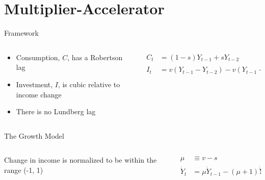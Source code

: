 \documentclass{beamer}
\begin{document}
\section*{Multiplier-Accelerator}
\begin{frame}{Framework}
	\begin{columns}
	\begin{column}{0.5\textwidth}
		\begin{itemize}
			\item Consumption, $C$, has a Robertson lag
			\item Investment, $I$, is cubic relative to income change
			\item There is no Lundberg lag
		\end{itemize}
	\end{column}
	\begin{column}{0.5\textwidth}
		\begin{align*}
			C_t &= (1-s)Y_{t-1} + sY_{t-2}\\
			I_t &= v(Y_{t-1}-Y_{t-2})-v(Y_{t-1}-Y_{t-2})^3
		\end{align*}
	\end{column}
	\end{columns}
\end{frame}
\begin{frame}{The Growth Model}
	\begin{columns}
	\begin{column}{0.5\textwidth}
		Change in income is normalized\autocite{Puu2003} to be within the range (-1, 1)
	\end{column}
	\begin{column}{0.5\textwidth}
		\begin{align*}
			\mu &\equiv v-s\\
			\dot Y_t &= \mu\dot Y_{t-1}-(\mu+1)\dot Y_{t-1}^3
		\end{align*}
	\end{column}
	\end{columns}
\end{frame}
\end{document}
